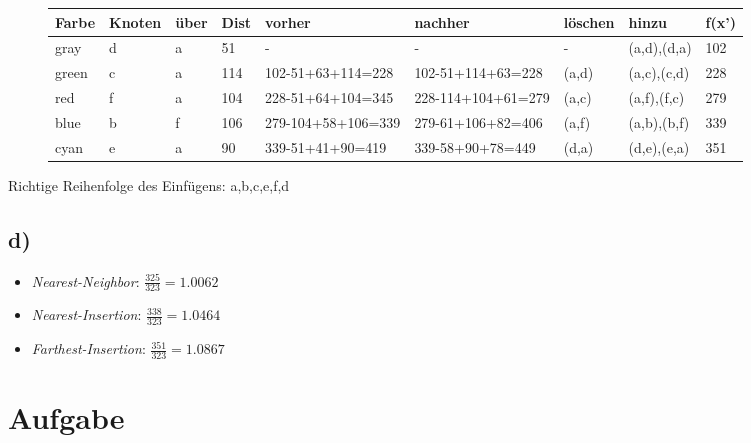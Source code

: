 \documentclass[12pt]{article}
\begin{document}
	\begin{figure}[H]
		\centering
		\begin{tabular}{l | l | l|l|l|l|l|l|l}
			Farbe & Knoten & über & Dist & vorher & nachher &löschen & hinzu & f(x') \\ \hline
			\color{gray}gray & d & a & 51 & - & - & - & (a,d),(d,a) & 102 \\
			\color{green}green & c & a & 114 & 102-51+63+114=228 & 102-51+114+63=228 & (a,d) & (a,c),(c,d) & 228\\
			\color{red}red & f & a & 104 & 228-51+64+104=345 & 228-114+104+61=279 & (a,c) & (a,f),(f,c) & 279\\
			\color{blue}blue & b & f & 106 & 279-104+58+106=339 & 279-61+106+82=406 & (a,f) & (a,b),(b,f) & 339\\
			\color{cyan}cyan & e & a & 90 & 339-51+41+90=419 & 339-58+90+78=449 & (d,a) & (d,e),(e,a) & 351\\
		\end{tabular}
	\end{figure}

	Richtige Reihenfolge des Einfügens: a,b,c,e,f,d
	\subsection{d)}
		\begin{itemize}
			\item \textit{Nearest-Neighbor}: $\frac{325}{323}=1.0062$
			\item \textit{Nearest-Insertion}: $\frac{338}{323}=1.0464$
			\item \textit{Farthest-Insertion}: $\frac{351}{323}=1.0867$
		\end{itemize}
		
	\section{Aufgabe}
		
		
\end{document}
